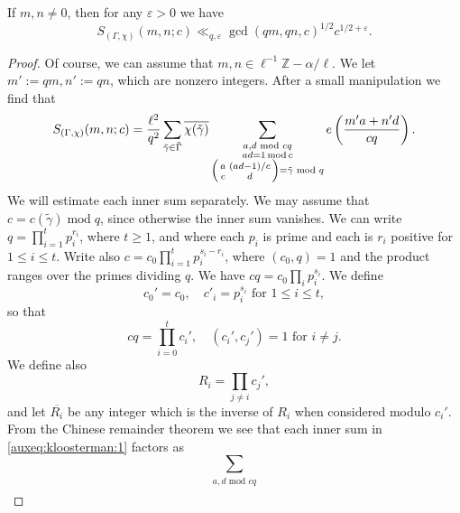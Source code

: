 \documentclass[10pt,a4paper]{amsart}
\DeclareMathOperator{\modulo}{mod}
\newcommand{\Z}{\mathbb{Z}}
\begin{document}
\begin{lem}\label{lem:weilbound}
If $m, n \neq 0$, then for any $\varepsilon > 0$ we have
\begin{equation*}
 S_{(\Gamma, \chi)}(m, n; c) \ll_{q, \varepsilon} \gcd(qm, qn, c)^{1/2}c^{1/2 + \varepsilon}.
\end{equation*}
\end{lem}

\begin{proof}
Of course, we can assume that $m, n \in \ell^{-1}\Z - \alpha/\ell$. We let $m' := qm, n' := qn$, which are nonzero integers. After a small manipulation we find that 
\begin{equation}\label{auxeq:kloosterman:1}
    S_{(\Gamma, \chi)}(m, n; c)  = \frac{\ell^2}{q^2}\sum_{\tilde{\gamma} \in \tilde{\Gamma}}\overline{\chi(\tilde{\gamma})}\sum_{\substack{a, d \text{ mod }cq\\
    ad = 1 \modulo c\\
    \begin{psmallmatrix}
        a & (ad-1)/c\\
        c & d
    \end{psmallmatrix} = \tilde{\gamma} \text{ mod }q}} e\left(\frac{m'a + n'd}{cq}\right).
\end{equation}
We will estimate each inner sum separately. We may assume that $c = c(\widetilde{\gamma}) \modulo q$, since otherwise the inner sum vanishes. We can write $q = \prod_{i= 1}^t p_i^{r_i}$, where $t\geq 1$, and where each $p_i$ is prime and each is $r_i$ positive for $1 \leq i \leq t$. Write also $c = c_0 \prod_{i = 1}^t p_i^{s_i - r_i}$, where $(c_0, q) = 1$ and the product ranges over the primes dividing $q$. We have
$cq = c_0 \prod_i p_i^{s_i}$. We define
\begin{equation*}
    c_0' = c_0, \quad c'_i  = p_i^{s_i} \text{ for }1\leq i \leq t,
\end{equation*}
so that 
\begin{equation*}
    cq = \prod_{i=0}^t c_i', \quad (c_i', c_j') = 1 \text{ for } i\not = j.
\end{equation*}
We define also 
\begin{equation*}
    R_i = \prod_{j \neq i} c_j',
\end{equation*}
and let $\overline{R_i}$ be any integer which is the inverse of $R_i$ when considered modulo $c_i'$. From the Chinese remainder theorem we see that each inner sum in \eqref{auxeq:kloosterman:1} factors as 
\begin{equation*}
    \sum_{\substack{a, d \text{ mod }cq\\
}}
\end{equation*}
\end{proof}
\end{document}
